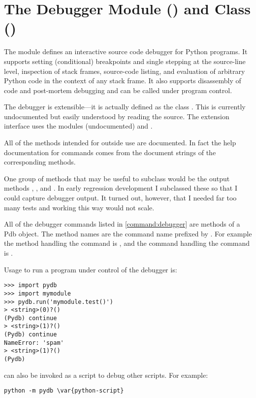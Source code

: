 \section{The Debugger Module () and Class () \label{pydb-module-class}}

The module  defines an interactive source code
debugger for Python programs.  It supports setting
(conditional) breakpoints and single stepping at the source-line
level, inspection of stack frames, source-code listing, and evaluation
of arbitrary Python code in the context of any stack frame.  It also
supports disassembly of code and post-mortem debugging and can be
called under program control.

The debugger is extensible---it is actually defined as the class
.
This is currently undocumented but easily understood by reading the
source.  The extension interface uses the modules
 (undocumented) and
.

All of the methods intended for outside use are documented. In fact
the help documentation for commands comes from the document strings of
the corresponding methods.

One group of methods that may be useful to subclass would be the
output methods , , and
. In early regression development I subclassed these
so that I could capture debugger output. It turned out, however, that
I needed far too many tests and working this way would not scale.

All of the debugger commands listed in \ref{command:debugger} are methods
of a Pdb object. The method names are the command name prefixed by
. For example the method handling the  command is
, and the command handling the  command is
. 

Usage to run a program under control of the debugger is:

\begin{verbatim}
>>> import pydb
>>> import mymodule
>>> pydb.run('mymodule.test()')
> <string>(0)?()
(Pydb) continue
> <string>(1)?()
(Pydb) continue
NameError: 'spam'
> <string>(1)?()
(Pydb) 
\end{verbatim}

 can also be invoked as
a script to debug other scripts.  For example:

\begin{verbatim}
python -m pydb \var{python-script}
\end{verbatim}

